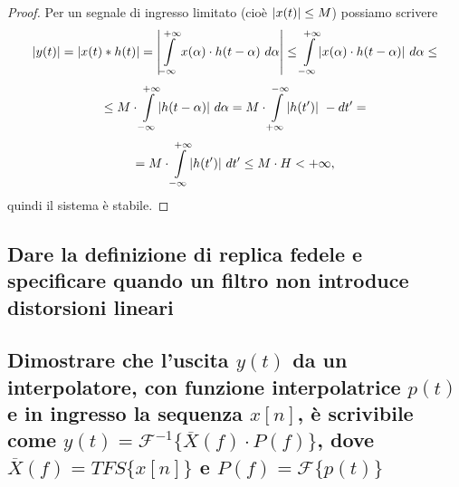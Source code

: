 \documentclass[12pt,oneside,openany]{memoir}
\numberwithin{equation}{subsection}
\DeclarePairedDelimiter{\abs}{\lvert}{\rvert}
\begin{document}
\begin{proof}
Per un segnale di ingresso limitato (cio\`e $\abs{x(t)} \leq M$) possiamo
scrivere
\[
    \abs{y(t)} = \abs{x(t) * h(t)} = \left|
        \int\displaylimits_{-\infty}^{+\infty} x(\alpha) \cdot h(t - \alpha)
        \ d\alpha
    \right| \leq \int\displaylimits_{-\infty}^{+\infty} \abs{
        x(\alpha) \cdot h(t - \alpha)
    } \ d\alpha \leq
\]
\[
    \leq M \cdot \int\displaylimits_{-\infty}^{+\infty}
    \abs{h(t - \alpha)} \ d\alpha = M \cdot
    \int\displaylimits_{+\infty}^{-\infty} \abs{h(t')} \ -dt' =
\]
\[
    = M \cdot \int\displaylimits_{-\infty}^{+\infty}
    \abs{h(t')} \ dt' \leq M \cdot H < +\infty,
\]
quindi il sistema \`e stabile.
\end{proof}


\newpage
\subsection{Dare la definizione di replica fedele e specificare quando un filtro
non introduce distorsioni lineari}


\newpage
\subsection{Dimostrare che l'uscita $y(t)$ da un interpolatore, con funzione
interpolatrice $p(t)$ e in ingresso la sequenza $x[n]$, \`e scrivibile come
$y(t) = \mathcal{F}^{-1}\{\overline{X}(f) \cdot P(f)\}$, dove $\overline{X}(f) =
TFS\{x[n]\}$ e $P(f) = \mathcal{F}\{p(t)\}$}

\end{document}
